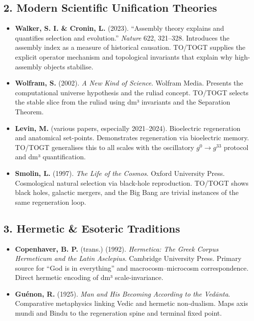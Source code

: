 \documentclass[19pt]{book}
\theoremstyle{plain}
\theoremstyle{definition}
\theoremstyle{remark}
\begin{document}
\begin{enumerate}
\subsection{2. Modern Scientific Unification Theories}

\begin{itemize}
\item \textbf{Walker, S. I. \& Cronin, L.} (2023). “Assembly theory explains and quantifies selection and evolution.” \emph{Nature} 622, 321–328.  
  Introduces the assembly index as a measure of historical causation. TO/TOGT supplies the explicit operator mechanism and topological invariants that explain why high-assembly objects stabilise.

\item \textbf{Wolfram, S.} (2002). \emph{A New Kind of Science}. Wolfram Media.  
  Presents the computational universe hypothesis and the ruliad concept. TO/TOGT selects the stable slice from the ruliad using dm³ invariants and the Separation Theorem.

\item \textbf{Levin, M.} (various papers, especially 2021–2024). Bioelectric regeneration and anatomical set-points.  
  Demonstrates regeneration via bioelectric memory. TO/TOGT generalises this to all scales with the oscillatory \(g^0 \to g^{33}\) protocol and dm³ quantification.

\item \textbf{Smolin, L.} (1997). \emph{The Life of the Cosmos}. Oxford University Press.  
  Cosmological natural selection via black-hole reproduction. TO/TOGT shows black holes, galactic mergers, and the Big Bang are trivial instances of the same regeneration loop.
\end{itemize}

\subsection{3. Hermetic \& Esoteric Traditions}

\begin{itemize}
\item \textbf{Copenhaver, B. P.} (trans.) (1992). \emph{Hermetica: The Greek Corpus Hermeticum and the Latin Asclepius}. Cambridge University Press.  
  Primary source for “God is in everything” and macrocosm–microcosm correspondence. Direct hermetic encoding of dm³ scale-invariance.

\item \textbf{Guénon, R.} (1925). \emph{Man and His Becoming According to the Vedānta}.  
  Comparative metaphysics linking Vedic and hermetic non-dualism. Maps axis mundi and Bindu to the regeneration spine and terminal fixed point.


\end{itemize}
\end{enumerate}
\end{document}
